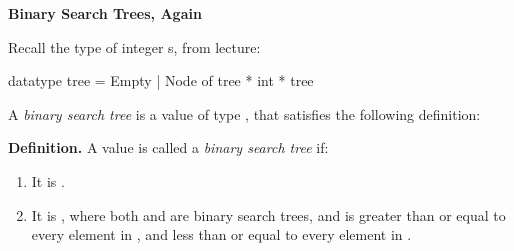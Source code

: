 \documentclass[addpoints,12pt, answers]{exam}
\begin{document}
\begin{questions}








\newpage
{}

\textbf{Binary Search Trees, Again}

Recall the type of integer s, from lecture:
\begin{codeblock}
  datatype tree = Empty | Node of tree * int * tree
\end{codeblock}

A \textit{binary search tree} is a value of type , that satisfies the
following definition:

\textbf{Definition.} A value  is called a \textit{binary search tree} if:
\begin{enumerate}
  \item It is .
  \item It is , where both  and  are binary
  search trees, and  is greater than or equal to every
  element in , and less than or equal to every element in .
\end{enumerate}


\end{questions}
\end{document}
